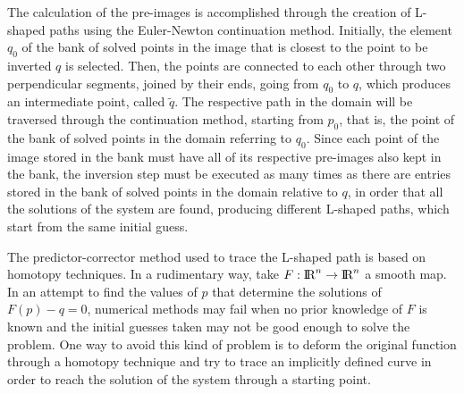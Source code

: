 \documentclass[journal=iecred,manuscript=article]{achemso}
\theoremstyle{definition}
\theoremstyle{remark}
\begin{document}
The calculation of the pre-images is accomplished through the creation of L-shaped paths using the Euler-Newton continuation method. Initially, the element $ q_{0} $ of the bank of solved points in the image that is closest to the point to be inverted $ q $ is selected. Then, the points are connected to each other through two perpendicular segments, joined by their ends, going from $ q_{0} $ to $ q $, which produces an intermediate point, called $ \tilde{q} $. The respective path in the domain will be traversed through the continuation method, starting from $ p_{0} $, that is, the point of the bank of solved points in the domain referring to $ q_{0} $. Since each point of the image stored in the bank must have all of its respective pre-images also kept in the bank, the inversion step must be executed as many times as there are entries stored in the bank of solved points in the domain relative to $ q $, in order that all the solutions of the system are found, producing different L-shaped paths, which start from the same initial guess.

The predictor-corrector method used to trace the L-shaped path is based on homotopy techniques.
%
%
In a rudimentary way, take $ F:\text{I\!R}^{n} \to \text{I\!R}^{n} $ a smooth map. In an attempt to find the values of $ p $ that determine the solutions of $ F\left(p\right) - q = 0 $, numerical methods may fail when no prior knowledge of $ F $ is known and the initial guesses taken may not be good enough to solve the problem. One way to avoid this kind of problem is to deform the original function through a homotopy technique and try to trace an implicitly defined curve in order to reach the solution of the system through a starting point.
%
%
%
\end{document}
